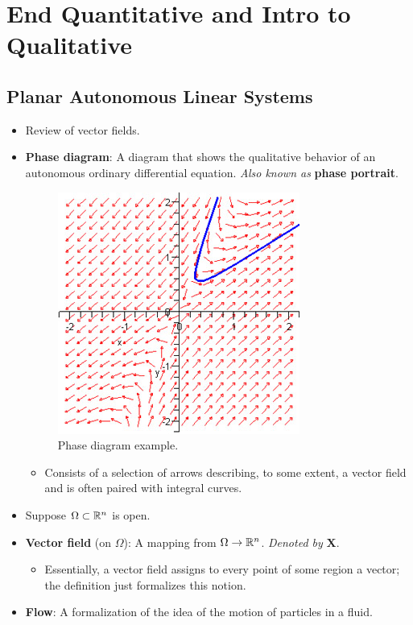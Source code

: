 \documentclass[../notes.tex]{subfiles}
\begin{document}
\chapter{End Quantitative and Intro to Qualitative}
\section{Planar Autonomous Linear Systems}
\begin{itemize}
    \item {}Review of vector fields.
    \item \textbf{Phase diagram}: A diagram that shows the qualitative behavior of an autonomous ordinary differential equation. \emph{Also known as} \textbf{phase portrait}.
    \begin{figure}[h!]
        \centering
        \includegraphics[width=0.4\linewidth]{../ExtFiles/exPhaseDiagram.jpeg}
        \caption{Phase diagram example.}
        \label{fig:exPhaseDiagram}
    \end{figure}
    \begin{itemize}
        \item Consists of a selection of arrows describing, to some extent, a vector field and is often paired with integral curves.
    \end{itemize}
    \item Suppose $\Omega\subset\mathbb{R}^n$ is open.
    \item \textbf{Vector field} (on $\Omega$): A mapping from $\Omega\to\mathbb{R}^n$. \emph{Denoted by} $\bm{X}$.
    \begin{itemize}
        \item Essentially, a vector field assigns to every point of some region a vector; the definition just formalizes this notion.
    \end{itemize}
    \item \textbf{Flow}: A formalization of the idea of the motion of particles in a fluid.
    \begin{itemize}

\end{itemize}
\end{itemize}
\end{document}
